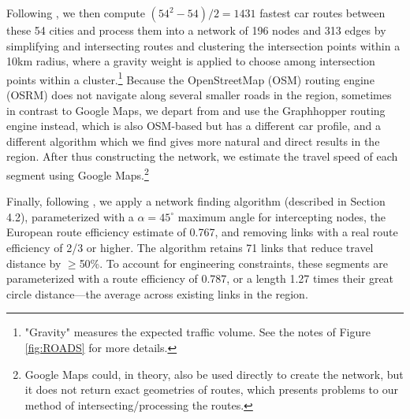 \documentclass[a4paper]{article}
\begin{document}
Following \citet{krantz2024optimal}, we then compute $(54^2-54)/2 = 1431$ fastest car routes between these 54 cities and process them into a network of 196 nodes and 313 edges by simplifying and intersecting routes and clustering the intersection points within a 10km radius, where a gravity weight is applied to choose among intersection points within a cluster.\footnote{"Gravity" measures the expected traffic volume. See the notes of Figure \ref{fig:ROADS} for more details.} Because the OpenStreetMap (OSM) routing engine (OSRM) does not navigate along several smaller roads in the region, sometimes in contrast to Google Maps, we depart from \citet{krantz2024optimal} and use the Graphhopper routing engine instead, which is also OSM-based but has a different car profile, and a different algorithm which we find gives more natural and direct results in the region. After thus constructing the network, we estimate the travel speed of each segment using Google Maps.\footnote{Google Maps could, in theory, also be used directly to create the network, but it does not return exact geometries of routes, which presents problems to our method of intersecting/processing the routes. \vspace{-4mm}}   \newline 

Finally, following \citet{krantz2024optimal}, we apply a network finding algorithm (described in \citet{krantz2024optimal} Section 4.2), parameterized with a $\alpha = 45^\circ$ maximum angle for intercepting nodes, the European route efficiency estimate of 0.767, and removing links with a real route efficiency of 2/3 or higher. The algorithm retains 71 links that reduce travel distance by $\geq$50\%. To account for engineering constraints, these segments are parameterized with a route efficiency of 0.787, or a length 1.27 times their great circle distance---the average across existing links in the region.  %
\end{document}
